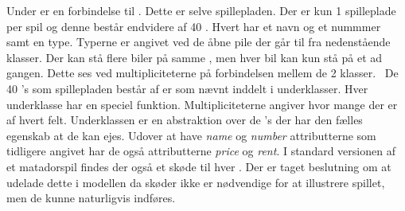 Under  er en forbindelse til . Dette er selve spillepladen. Der er kun 1 spilleplade per spil og denne består endvidere af 40 . Hvert  har et navn og et nummmer samt en type. Typerne er angivet ved de åbne pile der går til  fra nedenstående klasser. Der kan stå flere biler på samme , men hver bil kan kun stå på et  ad gangen. Dette ses ved multipliciteterne på forbindelsen mellem de 2 klasser. \
De 40 's som spillepladen består af er som nævnt inddelt i underklasser. Hver underklasse har en speciel funktion. Multipliciteterne angiver hvor mange der er af hvert felt. Underklassen  er en abstraktion over de 's der har den fælles egenskab at de kan ejes. Udover at have \textit{name} og \textit{number} attributterne som tidligere angivet har de også attributterne \textit{price} og \textit{rent}. I standard versionen af et matadorspil findes der også et skøde til hver . Der er taget beslutning om at udelade dette i modellen da skøder ikke er nødvendige for at illustrere spillet, men de kunne naturligvis indføres.           
